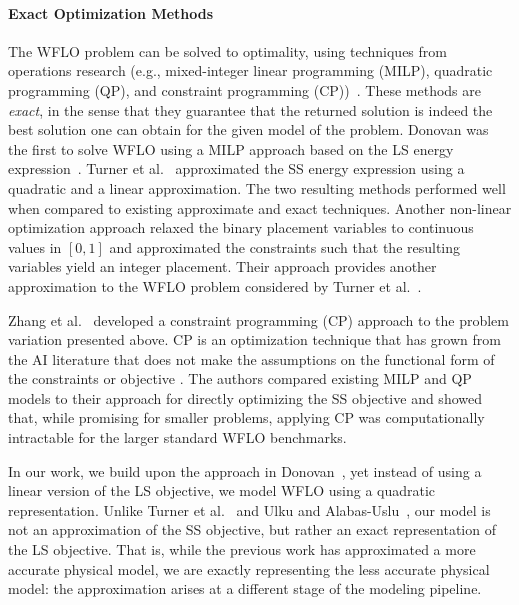 \documentclass[preprint,12pt]{elsarticle}
\begin{document}
\paragraph{Exact Optimization Methods} 
The WFLO problem can be solved  
to optimality, using
techniques from operations research (e.g., mixed-integer linear programming (MILP), quadratic programming (QP), and constraint programming (CP))~\cite{Zhang2014,turner2014new,donovan2005wind}.
These methods are \emph{exact}, in the sense that they guarantee that the returned solution is indeed
the best solution one can obtain for the given model of the problem. Donovan was the first to solve WFLO using a
MILP approach based on the LS energy expression~\cite{donovan2005wind}. Turner et al.\ \cite{turner2014new} approximated the SS energy expression using a quadratic and a linear approximation. The two resulting methods performed well when
compared to existing approximate and exact techniques.
Another non-linear optimization approach \cite{ulku2019new} relaxed the binary placement variables to continuous values in $[0,1]$
and approximated the constraints such that the resulting variables yield an integer placement.
Their approach provides another approximation to the WFLO problem considered by Turner et al.\ \cite{turner2014new}.

Zhang et al.\ \cite{Zhang2014} developed a constraint programming (CP) approach to the problem variation presented above. CP is an optimization technique that has grown from the AI literature that does not make the assumptions on the functional form of the constraints or objective \cite{rossi2006handbook}. The authors compared existing MILP and QP models to their approach for directly optimizing the SS objective and showed that, while promising for smaller problems, applying CP was computationally intractable for the larger standard WFLO benchmarks. 


In our work, we build upon the approach in Donovan~\cite{donovan2005wind}, yet instead of using a linear version of the LS objective, we 
model WFLO using a quadratic representation. %
Unlike Turner et al.\ \cite{turner2014new} and Ulku and Alabas-Uslu\ \cite{ulku2019new}, our model is not an approximation of the SS objective, 
but rather an exact representation of the LS objective. That is, while the previous work has approximated a more accurate physical model, we are exactly representing the less accurate physical model: the approximation arises at a different stage of the modeling pipeline.
\end{document}
